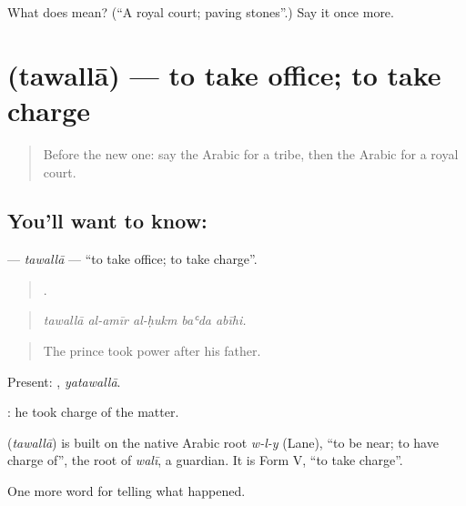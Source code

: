 \begin{tcolorbox}[breakable,colback=teal!4,colframe=teal!35!black,title={Before you move on}]
What does  mean? (\textquotedblleft{}A royal court; paving stones\textquotedblright{}.) Say it once more.
\end{tcolorbox}
\section[\texorpdfstring{\ar{تولى} (tawallā)}{تولى (tawallā)}]{ (tawallā) — to take office; to take charge}

\label{lesson:AR-C340-tawalla}



\begin{quote}
Before the new one: say the Arabic for a tribe, then the Arabic for a royal court.
\end{quote}

\subsection*{You'll want to know: }
\textbf{} — \emph{tawallā} — \textquotedblleft{}to take office; to take charge\textquotedblright{}.

\begin{quote}
    .
\end{quote}

\begin{quote}
\emph{tawallā al-amīr al-ḥukm baʿda abīhi.}
\end{quote}

\begin{quote}
The prince took power after his father.
\end{quote}

Present: , \emph{yatawallā}.

 : he took charge of the matter.

\begin{cousinweb}
\textbf{} (\emph{tawallā}) is built on the native Arabic root \emph{w-l-y} (Lane), \textquotedblleft{}to be near; to have charge of\textquotedblright{}, the root of \emph{walī}, a guardian. It is Form V, \textquotedblleft{}to take charge\textquotedblright{}.
\end{cousinweb}

\begin{grammarlens}[title={What you've built}]
One more word for telling what happened.
\end{grammarlens}

